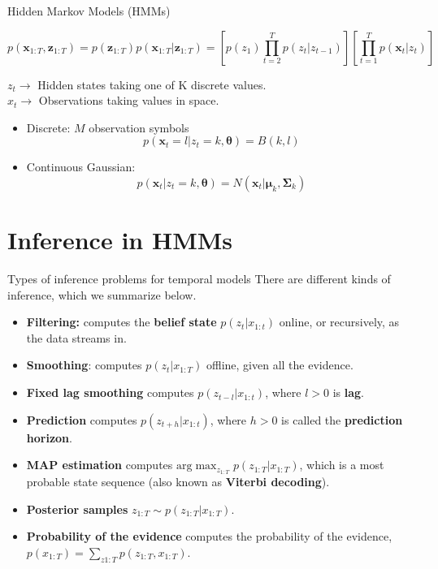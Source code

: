 \documentclass[10pt,mathserif]{beamer}
\begin{document}
\begin{frame}{Hidden Markov Models (HMMs)}

\begin{equation*}
    p(\bm{x}_{1:T}, \bm{z}_{1:T}) = p(\bm{z}_{1:T})p(\bm{x}_{1:T}|\bm{z}_{1:T})  = \left[ p(z_1) \prod_{t=2}^T p(z_t|z_{t-1}) \right] \left[ \prod_{t=1}^T p(\bm{x}_t|z_t)\right]
\end{equation*}

$z_t \rightarrow $ Hidden states taking one of K discrete values.\\
$x_t \rightarrow $ Observations taking values in space.

\begin{itemize}
    \item Discrete: $M$ observation symbols
    \begin{equation*}
        p(\bm{x}_t = l|z_t = k,\bm{\theta}) = B(k,l)
    \end{equation*}
    \item Continuous Gaussian:
    \begin{equation*}
        p(\bm{x}_t|z_t = k,\bm{\theta}) = N(\bm{x}_t|\bm{\mu}_k, \bm{\Sigma}_k)
    \end{equation*}
\end{itemize}
\end{frame}

\section{Inference in HMMs}
\begin{frame}{Types of inference problems for temporal models}
There are different kinds of inference, which we summarize below.
\begin{itemize}
    \item \textbf{Filtering:} computes the \textbf{belief state} $p(z_t|x_{1:t})$ online, or recursively, as the data streams in.
    \item \textbf{Smoothing}: computes $p(z_t|x_{1:T})$ offline, given all the evidence. 
    \item \textbf{Fixed lag smoothing} computes $p(z_{t-l}|x_{1:t})$, where $l > 0$ is \textbf{lag}.
    \item \textbf{Prediction} computes $p(z_{t+h}|x_{1:t})$, where $h > 0$ is called the \textbf{prediction horizon}. 
    \item \textbf{MAP estimation} computes $\text{arg}\max_{z_{1:T}} p(z_{1:T} |x_{1:T})$, which is a most probable state sequence (also known as \textbf{Viterbi decoding}). 
    \item \textbf{Posterior samples} $z_{1:T} \sim p(z_{1:T} |x_{1:T})$.
    \item \textbf{Probability of the evidence} computes the probability of the evidence, $p(x_{1:T}) = \sum_{z1:T} p(z_{1:T}, x_{1:T})$.
\end{itemize}
\end{frame}
\end{document}
